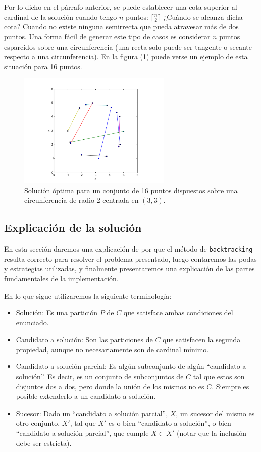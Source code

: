 Por lo dicho en el párrafo anterior, se puede establecer una cota superior al cardinal de la solución cuando tengo $n$ puntos: $\lceil\frac{n}{2}\rceil$ ¿Cuándo se alcanza dicha cota? Cuando no existe ninguna semirrecta que pueda atravesar más de dos puntos. Una forma fácil de generar este tipo de casos es considerar $n$ puntos esparcidos sobre una circunferencia (una recta solo puede ser tangente o secante respecto a una circunferencia). En la figura (\ref{fig:ej3-5}) puede verse un ejemplo de esta situación para 16 puntos.

\begin{figure}[H]
  \centering
  \includegraphics[width=0.65\textwidth]{img/ejemplos/ej3-5.pdf}
  \caption{\footnotesize Solución óptima para un conjunto de 16 puntos dispuestos sobre una circunferencia de radio 2 centrada en $(3,3)$.}
  \label{fig:ej3-5}
\end{figure}

\subsection{Explicación de la solución}
En esta sección daremos una explicación de por que el método de \texttt{backtracking} resulta correcto para resolver el problema presentado,  luego contaremos las podas y estrategias utilizadas, y finalmente presentaremos una explicación de las partes fundamentales de la implementación. 

En lo que sigue utilizaremos la siguiente terminología:
\begin{itemize}
  \item Solución: Es una partición $P$ de $C$ que satisface ambas condiciones del enunciado.
  \item Candidato a solución: Son las particiones de $C$ que satisfacen la segunda propiedad, aunque no necesariamente son de cardinal mínimo.
  \item Candidato a solución parcial: Es algún subconjunto de algún ``candidato a solución''. Es decir, es un conjunto de subconjuntos de $C$ tal que estos son disjuntos dos a dos, pero donde la unión de los mismos no es $C$. Siempre es posible extenderlo a un candidato a solución.
  \item Sucesor: Dado un ``candidato a solución parcial'', $X$, un sucesor del mismo es otro conjunto, $X'$, tal que $X'$ es o bien ``candidato a solución'', o bien ``candidato a solución parcial'', que cumple $X \subset X'$ (notar que la inclusión debe ser estricta).
\end{itemize}

